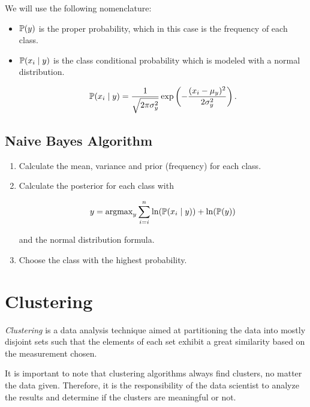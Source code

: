 We will use the following nomenclature:

\begin{itemize}

	\item \(\mathbb{P}(y)\) is the proper probability, which in this case is the frequency of each class.

	\item  \(\mathbb{P}(x_i \mid y)\) is the class conditional probability which is modeled with a normal distribution.

	      \[
		      \mathbb{P}(x_i \mid y) = \frac{1}{\sqrt{2\pi \sigma_y^2}} \exp\left(- \frac{(x_i - \mu_y)^2}{2 \sigma_y^2}\right).
	      \]

\end{itemize}

\subsection{Naive Bayes Algorithm}

\begin{enumerate}

	\item Calculate the mean, variance and prior (frequency) for each class.

	\item Calculate the posterior for each class with

	      \[
		      y = \mathrm{argmax}_y \sum_{i = i }^{n} \ln(\mathbb{P}(x_i \mid y)) + \ln(\mathbb{P}(y))
	      \]

	      and the normal distribution formula.

	\item Choose the class with the highest probability.

\end{enumerate}

\section{Clustering}

\emph{Clustering} is a data analysis technique aimed at partitioning the data into mostly disjoint sets 
such that the elements of each set exhibit a great similarity based on the measurement chosen.

It is important to note that clustering algorithms always find clusters, no matter the data given. Therefore, it is the responsibility of 
the data scientist to analyze the results and determine if the clusters are meaningful or not.
